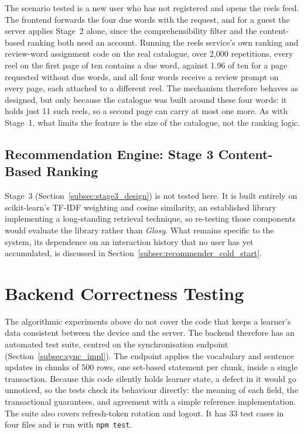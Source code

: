    The scenario tested is a new user who has not registered and opens the reels feed. The frontend forwards the four due words with the request, and for a guest the server applies Stage~2 alone, since the comprehensibility filter and the content-based ranking both need an account. Running the reels service's own ranking and review-word assignment code on the real catalogue, over 2{,}000 repetitions, every reel on the first page of ten contains a due word, against 1.96 of ten for a page requested without due words, and all four words receive a review prompt on every page, each attached to a different reel. The mechanism therefore behaves as designed, but only because the catalogue was built around these four words: it holds just 11 such reels, so a second page can carry at most one more. As with Stage~1, what limits the feature is the size of the catalogue, not the ranking logic.

    \subsection{Recommendation Engine: Stage 3 Content-Based Ranking}
    \label{subsec:stage3_eval}
    Stage~3 (Section~\ref{subsec:stage3_design}) is not tested here. It is built entirely on scikit-learn's TF-IDF weighting and cosine similarity, an established library implementing a long-standing retrieval technique, so re-testing those components would evaluate the library rather than \textit{Glosy}. What remains specific to the system, its dependence on an interaction history that no user has yet accumulated, is discussed in Section~\ref{subsec:recommender_cold_start}.


\section{Backend Correctness Testing}
\label{sec:backend_tests}
    The algorithmic experiments above do not cover the code that keeps a learner's data consistent between the device and the server. The backend therefore has an automated test suite, centred on the synchronisation endpoint (Section~\ref{subsec:sync_impl}). The endpoint applies the vocabulary and sentence updates in chunks of 500 rows, one set-based statement per chunk, inside a single transaction. Because this code silently holds learner state, a defect in it would go unnoticed, so the tests check its behaviour directly: the meaning of each field, the transactional guarantees, and agreement with a simple reference implementation. The suite also covers refresh-token rotation and logout. It has 33 test cases in four files and is run with \texttt{npm test}.

